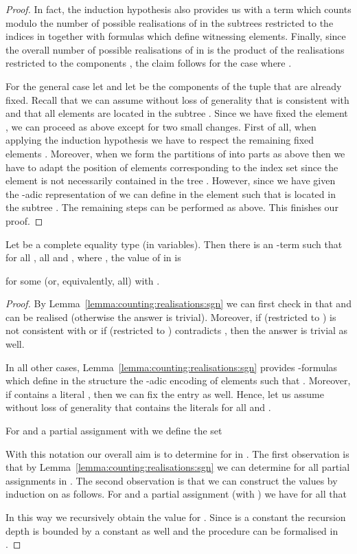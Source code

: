 \documentclass[a4paper,UKenglish]{lipics}
\theoremstyle{plain}
\begin{document}
\begin{proof}
In fact, the induction hypothesis also provides us with a term which counts
modulo  the number of possible realisations of  in the subtrees 
 restricted to the indices in  together
with formulas  which define witnessing elements. 
Finally, since the overall number of possible realisations of  in
 is the product of the realisations restricted to the components
, the claim follows for the case where . 

For the general case let  and let  be the components of the tuple  that are already fixed. 
Recall that we can assume without loss of generality that 
 is consistent with  and that
all elements  are located in the subtree .
Since we have fixed the element , we can proceed as above except for two
small changes. First of all, when applying the induction hypothesis we have 
to respect the remaining fixed elements . Moreover, when we
form the partitions of  into parts  as
above then we have to adapt the position of elements corresponding to the index
set  since the element  is not necessarily contained in the tree
. However, since we have given the -adic
representation of  we can define in  the element 
such that  is located in the subtree . 
The remaining steps can be performed as above. This finishes our proof.
\end{proof}

\begin{lemma}\label{lemma:entrymn:comp:type}
Let
 be a complete 
equality type (in  variables).
Then there is an -term  such that for all 
, all  and , 
where , the value
 of  in  is 

for some (or, equivalently, all)  with .
\end{lemma}
\begin{proof}
 By Lemma~\ref{lemma:counting:realisations:sgn} we can first check in
 that  and  can be realised (otherwise the
answer is trivial). Moreover, if  (restricted to ) is not
consistent with  or if  (restricted to )
contradicts , then the answer is trivial as well.

In all other cases, Lemma~\ref{lemma:counting:realisations:sgn} provides 
-formulas which define in the structure  the -adic encoding 
of elements  such that . 
Moreover, if  contains a literal , then we can
fix the entry  as well. Hence, let us assume without loss of 
generality that  contains the literals  for all 
 and .

For  and a partial assignment  with  we define the set 
 

With this notation our overall aim is to determine  for  in . The first observation is
that by Lemma~\ref{lemma:counting:realisations:sgn} we can determine
 for all partial
assignments  in .
The second observation is that we can construct the values
 by induction on  as follows. 
For
 and a partial assignment  (with
) we have for all  that

In this way we recursively obtain the value 
 for . 
Since  is a 
constant the recursion depth is bounded by a constant as well and the 
procedure can be formalised in . 
\end{proof}
\end{document}
